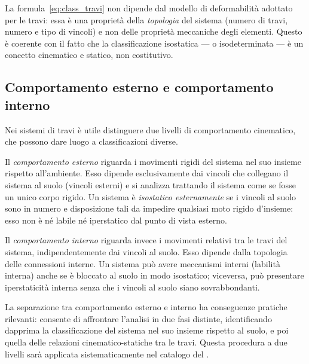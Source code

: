 \begin{oss}
	La formula~\eqref{eq:class_travi} non dipende dal
	modello di deformabilità adottato per le travi: essa è
	una proprietà della \emph{topologia} del sistema
	(numero di travi, numero e tipo di vincoli) e non
	delle proprietà meccaniche degli elementi. Questo è
	coerente con il fatto che la classificazione isostatica
	--- o isodeterminata --- è un concetto cinematico e
	statico, non costitutivo.
\end{oss}


\subsection{Comportamento esterno e comportamento interno}
\label{subsec:est_int}

Nei sistemi di travi è utile distinguere due livelli di
comportamento cinematico, che possono dare luogo a
classificazioni diverse.

Il \emph{comportamento esterno} riguarda i movimenti
rigidi del sistema nel suo insieme rispetto all'ambiente.
Esso dipende esclusivamente dai vincoli che collegano
il sistema al suolo (vincoli esterni) e si analizza
trattando il sistema come se fosse un unico corpo rigido.
Un sistema è \emph{isostatico esternamente} se i vincoli
al suolo sono in numero e disposizione tali da impedire
qualsiasi moto rigido d'insieme: esso non è né labile
né iperstatico dal punto di vista esterno.

Il \emph{comportamento interno} riguarda invece i movimenti
relativi tra le travi del sistema, indipendentemente dai
vincoli al suolo. Esso dipende dalla topologia delle
connessioni interne. Un sistema può avere meccanismi interni
(labilità interna) anche se è bloccato al suolo in modo
isostatico; viceversa, può presentare iperstaticità interna
senza che i vincoli al suolo siano sovrabbondanti.


La separazione tra comportamento esterno e interno ha
conseguenze pratiche rilevanti: consente di affrontare
l'analisi in due fasi distinte, identificando dapprima
la classificazione del sistema nel suo insieme rispetto
al suolo, e poi quella delle relazioni cinematico-statiche
tra le travi. Questa procedura a due livelli sarà applicata
sistematicamente nel catalogo del .


